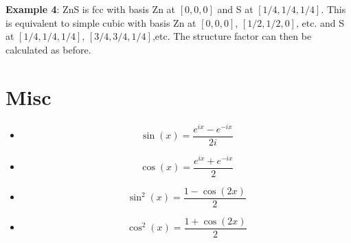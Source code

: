 \documentclass[10pt]{article}
\begin{document}
\textbf{Example 4}: ZnS is fcc with basis Zn at $[0,0,0]$ and S at $[1/4, 1/4, 1/4]$. This is equivalent to simple cubic with basis Zn at
$[0,0,0]$, $[1/2, 1/2, 0]$, etc. and S at $[1/4,1/4,1/4]$, $[3/4,3/4,1/4]$,etc. The structure factor can then be calculated as before. 




\section{Misc}
\begin{itemize}
  \item $$\sin(x) = \frac{e^{ix} - e^{-ix}}{2i}$$
  \item $$\cos(x) = \frac{e^{ix} + e^{-ix}}{2}$$
  \item $$\sin^{2}(x) = \frac{1 - \cos(2x)}{2}$$
  \item $$\cos^{2}(x) = \frac{1 + \cos(2x)}{2}$$
\end{itemize}
\end{document}
